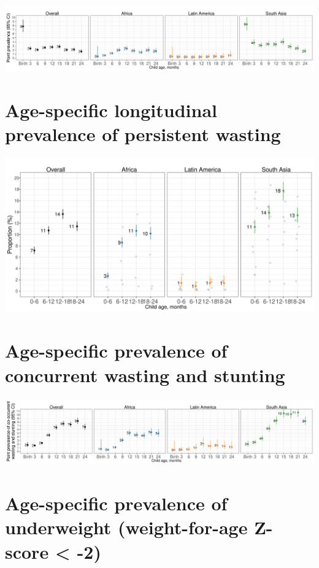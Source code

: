 \documentclass[
  9pt,
]{book}
\begin{document}
\includegraphics[width=58.33in]{figures//wasting/no-kenaba-bw/fig-sev-wast-no-Kenaba-BW}

\hypertarget{age-specific-longitudinal-prevalence-of-persistent-wasting-2}{%
\section{Age-specific longitudinal prevalence of persistent wasting}\label{age-specific-longitudinal-prevalence-of-persistent-wasting-2}}

\includegraphics[width=41.67in]{figures//wasting/no-kenaba-bw/fig-pers-wast-no-Kenaba-BW}

\hypertarget{age-specific-prevalence-of-concurrent-wasting-and-stunting-2}{%
\section{Age-specific prevalence of concurrent wasting and stunting}\label{age-specific-prevalence-of-concurrent-wasting-and-stunting-2}}

\includegraphics[width=58.33in]{figures//wasting/no-kenaba-bw/fig-co-prev-no-Kenaba-BW}

\hypertarget{age-specific-prevalence-of-underweight-weight-for-age-z-score--2-1}{%
\section{Age-specific prevalence of underweight (weight-for-age Z-score \textless{} -2)}\label{age-specific-prevalence-of-underweight-weight-for-age-z-score--2-1}}
\end{document}
